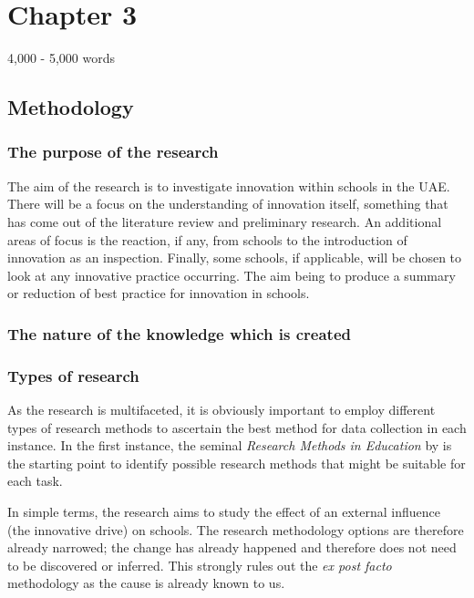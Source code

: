\section{Chapter 3}
4,000 - 5,000 words
\subsection{Methodology}

\subsubsection{The purpose of the research}
The aim of the research is to investigate innovation within schools in the UAE. There will be a focus on the understanding of innovation itself, something that has come out of the literature review and preliminary research. An additional areas of focus is the reaction, if any, from schools to the introduction of innovation as an inspection. Finally, some schools, if applicable, will be chosen to look at any innovative practice occurring. The aim being to produce a summary or reduction of best practice for innovation in schools.

\subsubsection{The nature of the knowledge which is created}


\subsubsection{Types of research}

As the research is multifaceted, it is obviously important to employ different types of research methods to ascertain the best method for data collection in each instance. In the first instance, the seminal \textit{Research Methods in Education} by \citet{Cohen2005} is the starting point to identify possible research methods that might be suitable for each task.

In simple terms, the research aims to study the effect of an external influence (the innovative drive) on schools. The research methodology options are therefore already narrowed; the change has already happened and therefore does not need to be discovered or inferred. This strongly rules out the \textit{ex post facto} methodology as the cause is already known to us.

